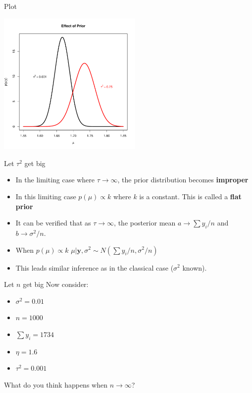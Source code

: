 \documentclass[10pt]{beamer}
\begin{document}
\begin{frame}{Plot}
  \begin{center}
    \includegraphics[height=7cm]{./Pics/compare1.pdf}
  \end{center}
\end{frame}
\begin{frame}{Let $\tau^2$ get big}
  \begin{itemize}
  \item In the limiting case where $\tau\rightarrow\infty$, the prior distribution becomes {\bf improper}

  \item In this limiting case $p(\mu)\propto k$ where $k$ is a constant.  This is called a {\bf flat prior}

  \item It can be verified that as $\tau\rightarrow\infty$, the posterior mean $a\rightarrow\sum y_i/n$ and $b\rightarrow \sigma^2/n$.

  \item When $p(\mu)\propto k$ $\mu|{\bm y}, \sigma^2\sim N(\sum y_i/n,\sigma^2/n)$

  \item This leads similar inference as in the classical case ($\sigma^2$ known).
  \end{itemize}
\end{frame}
\begin{frame}{Let $n$ get big}
  Now consider:
  \begin{itemize}
  \item $\sigma^2=0.01$
  \item $n=1000$
  \item $\sum y_i=1734$
  \item $\eta=1.6$
  \item $\tau^2=0.001$
  \end{itemize}
  What do you think happens when $n\rightarrow\infty$?
\end{frame}
\end{document}

